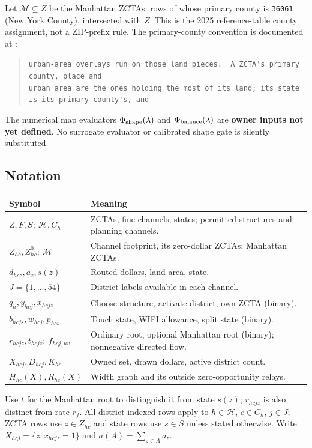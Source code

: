 \documentclass[11pt,letterpaper]{article}
\begin{document}
Let $\mathcal M\subseteq Z$ be the Manhattan ZCTAs: rows of
 whose primary county is
\texttt{36061} (New York County), intersected with $Z$. This is the
2025 reference-table county assignment, not a ZIP-prefix rule.
The primary-county convention is documented at :
\begin{quote}\scriptsize
\verb|urban-area overlays run on those land pieces.  A ZCTA's primary county, place and|\\
\verb|urban area are the ones holding the most of its land; its state is its primary county's, and|
\end{quote}
The numerical map evaluators $\Phi_{\rm shape}(\lambda)$ and
$\Phi_{\rm balance}(\lambda)$ are \textbf{owner inputs not yet defined}.
No surrogate evaluator or calibrated shape gate is silently substituted.

\subsection*{Notation}
\begin{center}
\begin{tabular}{p{}p{}}
\hline
Symbol & Meaning\\ \hline
$Z,F,S;\ \mathcal H,C_h$ & ZCTAs, fine channels, states; permitted structures and planning channels.\\
$Z_{hc},Z^0_{hc};\ \mathcal M$ & Channel footprint, its zero-dollar ZCTAs; Manhattan ZCTAs.\\
$d_{hcz},a_z,s(z)$ & Routed dollars, land area, state.\\
$J=\{1,\ldots,54\}$ & District labels available in each channel.\\
$q_h,y_{hcj},x_{hcjz}$ & Choose structure, activate district, own ZCTA (binary).\\
$b_{hcjs},w_{hcj},p_{hcs}$ & Touch state, WIFI allowance, split state (binary).\\
$r_{hcjz},t_{hcjz};\ f_{hcj,uv}$ & Ordinary root, optional Manhattan root (binary); nonnegative directed flow.\\
$X_{hcj},D_{hcj},K_{hc}$ & Owned set, drawn dollars, active district count.\\
$H_{hc}(X),R_{hc}(X)$ & Width graph and its outside zero-opportunity relays.\\ \hline
\end{tabular}
\end{center}
Use $t$ for the Manhattan root to distinguish it from state $s(z)$;
$r_{hcjz}$ is also distinct from rate $r_f$.
All district-indexed rows apply to $h\in\mathcal H$, $c\in C_h$, $j\in J$;
ZCTA rows use $z\in Z_{hc}$ and state rows use $s\in S$ unless stated otherwise.
Write $X_{hcj}=\{z:x_{hcjz}=1\}$ and $a(A)=\sum_{z\in A}a_z$.
\end{document}
